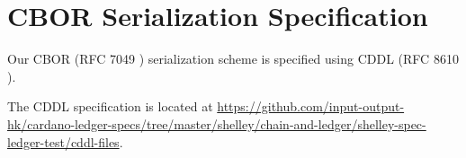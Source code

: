 \section{CBOR Serialization Specification}
\label{sec:cddl}

Our CBOR (RFC 7049 \cite{rfcCBOR})
serialization scheme is specified using
CDDL (RFC 8610 \cite{rfcCDDL}).

The CDDL specification is located at
\url{https://github.com/input-output-hk/cardano-ledger-specs/tree/master/shelley/chain-and-ledger/shelley-spec-ledger-test/cddl-files}.

% 
